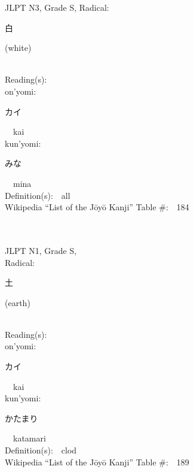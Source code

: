 \begin{multicols}{2}
{JLPT N3, Grade S, Radical:\ \ {\begin{CJK}{UTF8}{min} 白 \end{CJK}} (white) } \\
Reading(s):\ \ \\
{\hspace*{1em}}on'yomi:\ \ \\
{\hspace*{2em}}{\begin{CJK}{UTF8}{min} カイ \end{CJK}}\ \ kai\ \ \\
{\hspace*{1em}}kun'yomi:\ \ \\
{\hspace*{2em}}{\begin{CJK}{UTF8}{min} みな \end{CJK}}\ \ mina\ \ \\
Definition(s):\ \ all \\
Wikipedia ``List of the J\=oy\=o Kanji'' Table \#:\ \ 184 \\
\ \ \\
{\fontsize{34pt}{40pt}  }\ \ \\
{JLPT N1, Grade S, \\Radical:\ \ {\begin{CJK}{UTF8}{min} 土 \end{CJK}} (earth) } \\
Reading(s):\ \ \\
{\hspace*{1em}}on'yomi:\ \ \\
{\hspace*{2em}}{\begin{CJK}{UTF8}{min} カイ \end{CJK}}\ \ kai\ \ \\
{\hspace*{1em}}kun'yomi:\ \ \\
{\hspace*{2em}}{\begin{CJK}{UTF8}{min} かたまり \end{CJK}}\ \ katamari\ \ \\
Definition(s):\ \ clod \\
Wikipedia ``List of the J\=oy\=o Kanji'' Table \#:\ \ 189 \\
\ \ \\
{\fontsize{34pt}{40pt}  }\ \ \\

\end{multicols}
